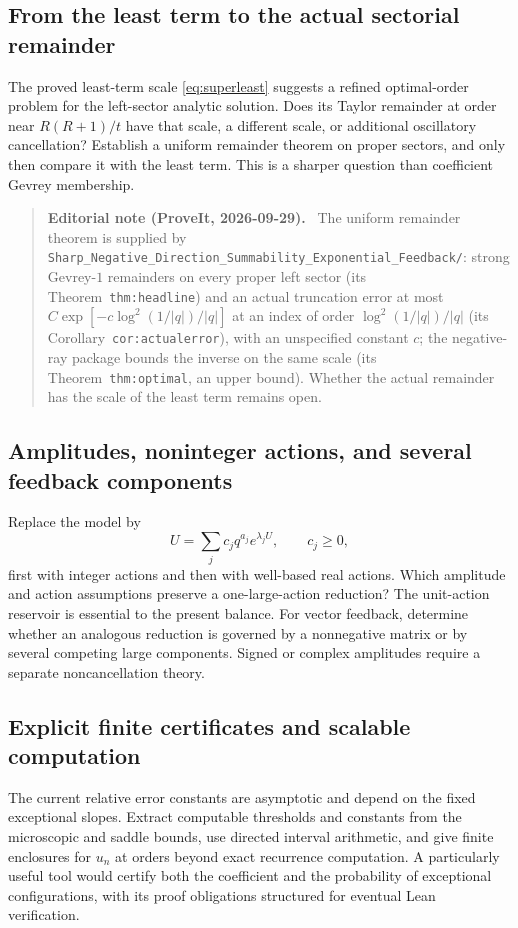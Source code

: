 \documentclass[11pt,a4paper]{article}
\theoremstyle{definition}
\numberwithin{equation}{section}
\newenvironment{ednote}{\par\smallskip\begin{quote}\small\raggedright\textbf{Editorial note (ProveIt, 2026-09-29).}\ }{\end{quote}\smallskip}
\begin{document}
\subsection{From the least term to the actual sectorial remainder}
The proved least-term scale \eqref{eq:superleast} suggests a refined
optimal-order problem for the left-sector analytic solution. Does its
Taylor remainder at order near \(R(R+1)/t\) have that scale, a different
scale, or additional oscillatory cancellation? Establish a uniform
remainder theorem on proper sectors, and only then compare it with the
least term. This is a sharper question than coefficient Gevrey membership.
\begin{ednote}
The uniform remainder theorem is supplied by
\nolinkurl{Sharp_Negative_Direction_Summability_Exponential_Feedback/}:
strong Gevrey-$1$ remainders on every proper left sector (its
Theorem~\texttt{thm:headline}) and an actual truncation error at most
$C\exp[-c\log^2(1/|q|)/|q|]$ at an index of order $\log^2(1/|q|)/|q|$
(its Corollary~\texttt{cor:actualerror}), with an unspecified constant $c$; the
negative-ray package bounds the inverse on the same scale (its
Theorem~\texttt{thm:optimal}, an upper bound). Whether the actual remainder has the
scale of the least term remains open.
\end{ednote}

\subsection{Amplitudes, noninteger actions, and several feedback components}
Replace the model by
\[
 U=\sum_j c_jq^{a_j}e^{\lambda_jU},\qquad c_j\ge0,
\]
first with integer actions and then with well-based real actions. Which
amplitude and action assumptions preserve a one-large-action reduction?
The unit-action reservoir is essential to the present balance. For vector
feedback, determine whether an analogous reduction is governed by a
nonnegative matrix or by several competing large components. Signed or
complex amplitudes require a separate noncancellation theory.

\subsection{Explicit finite certificates and scalable computation}
The current relative error constants are asymptotic and depend on the
fixed exceptional slopes. Extract computable thresholds and constants
from the microscopic and saddle bounds, use directed interval arithmetic,
and give finite enclosures for \(u_n\) at orders beyond exact recurrence
computation. A particularly useful tool would certify both the coefficient
and the probability of exceptional configurations, with its proof
obligations structured for eventual Lean verification.
\end{document}
